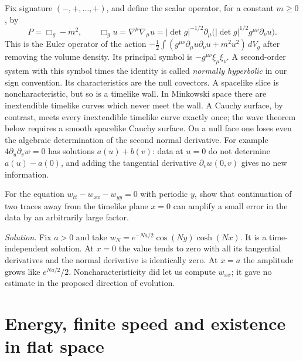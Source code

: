 Fix signature $(-,+,\ldots,+)$, and define the scalar operator, for a constant $m\geq0$, by
\begin{equation}
 P=\Box_g-m^2,\qquad \Box_g u=\nabla^\mu\nabla_\mu u
   =|\det g|^{-1/2}\partial_\mu\big(|\det g|^{1/2}g^{\mu\nu}\partial_\nu u\big).
 \label{f:wave-operator}
\end{equation}
This is the Euler operator of the action $-\tfrac12\int(g^{\mu\nu}\partial_\mu u\partial_\nu u+m^2u^2)\,dV_g$ after removing the volume density. Its principal symbol is $-g^{\mu\nu}\xi_\mu\xi_\nu$. A second-order system with this symbol times the identity is called \emph{normally hyperbolic} in our sign convention. Its characteristics are the null covectors. A spacelike slice is noncharacteristic, but so is a timelike wall. In Minkowski space there are inextendible timelike curves which never meet the wall. A Cauchy surface, by contrast, meets every inextendible timelike curve exactly once; the wave theorem below requires a smooth spacelike Cauchy surface. On a null face one loses even the algebraic determination of the second normal derivative. For example $4\partial_u\partial_v w=0$ has solutions $a(u)+b(v)$: data at $u=0$ do not determine $a(u)-a(0)$, and adding the tangential derivative $\partial_vw(0,v)$ gives no new information.

\begin{exercise}
For the equation $w_{tt}-w_{xx}-w_{yy}=0$ with periodic $y$, show that continuation of two traces away from the timelike plane $x=0$ can amplify a small error in the data by an arbitrarily large factor.
\end{exercise}
\noindent\emph{Solution.} Fix $a>0$ and take $w_N=e^{-Na/2}\cos(Ny)\cosh(Nx)$. It is a time-independent solution. At $x=0$ the value tends to zero with all its tangential derivatives and the normal derivative is identically zero. At $x=a$ the amplitude grows like $e^{Na/2}/2$. Noncharacteristicity did let us compute $w_{xx}$; it gave no estimate in the proposed direction of evolution.

\section{Energy, finite speed and existence in flat space}\label{f:wave-energy}

